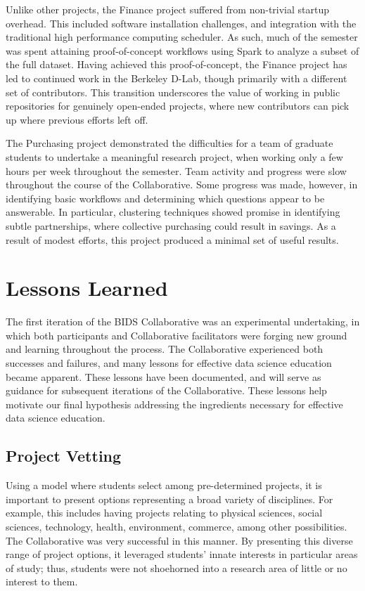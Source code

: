 \documentclass[12pt]{article}
\begin{document}
Unlike other projects, the Finance project suffered from non-trivial startup overhead.  This included software installation challenges, and integration with the traditional high performance computing scheduler. As such, much of the semester was spent attaining proof-of-concept workflows using Spark to analyze a subset of the full dataset.  Having achieved this proof-of-concept, the Finance project has led to continued work in the Berkeley D-Lab, though primarily with a different set of contributors. This transition underscores the value of working in public repositories for genuinely open-ended projects, where new contributors can pick up where previous efforts left off.

The Purchasing project demonstrated the difficulties for a team of graduate students to undertake a meaningful research project, when working only a few hours per week throughout the semester.  Team activity and progress were slow throughout the course of the Collaborative.  Some progress was made, however, in identifying basic workflows and determining which questions appear to be answerable. In particular, clustering techniques showed promise in identifying subtle partnerships, where collective purchasing could result in savings.  As a result of modest efforts, this project produced a minimal set of useful results.



\section{Lessons Learned}

The first iteration of the BIDS Collaborative was an experimental undertaking, in which both participants and Collaborative facilitators were forging new ground and learning throughout the process.  The Collaborative experienced both successes and failures, and many lessons for effective data science education became apparent.  These lessons have been documented, and will serve as guidance for subsequent iterations of the Collaborative. These lessons help motivate our final hypothesis addressing the ingredients necessary for effective data science education.

\subsection{Project Vetting}

Using a model where students select among pre-determined projects, it is important to present options representing a broad variety of disciplines.  For example, this includes having projects relating to physical sciences, social sciences, technology, health, environment, commerce, among other possibilities.  The Collaborative was very successful in this manner.  By presenting this diverse range of project options, it leveraged students' innate interests in particular areas of study; thus, students were not shoehorned into a research area of little or no interest to them.
\end{document}
